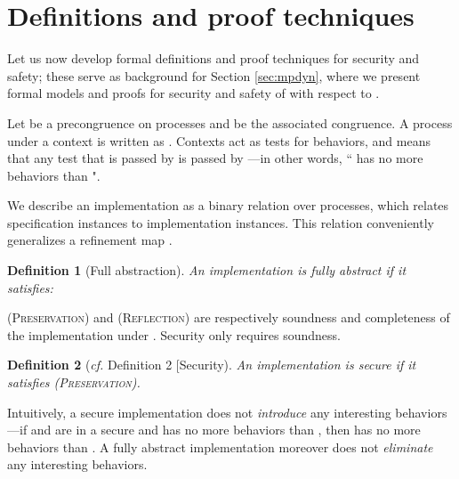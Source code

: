 \documentclass[10pt]{article}
\newtheorem{definition}{Definition}
\begin{document}
\section{Definitions and proof techniques}\label{theory}
\noindent
Let us now develop formal definitions and proof techniques for security and safety; these serve as background for Section \ref{sec:mpdyn}, where we present formal models and proofs for security and safety of  with respect to . 

Let  be a precongruence on processes and  be the associated congruence. A process  under a context  is written as . Contexts act as tests for behaviors, and  means that any test that is passed by  is passed by ---in other words, `` has no more behaviors than ". 

We describe an implementation as a binary relation  over processes, which relates specification instances to implementation instances. This relation conveniently generalizes a refinement map \cite{refmap}. 

\begin{definition}[Full abstraction] An implementation  is fully abstract if it satisfies:

\end{definition}
\noindent
(\textsc{Preservation}) and (\textsc{Reflection}) are respectively soundness and completeness of the implementation under . Security only requires soundness.
\begin{definition}[\emph{cf.} Definition 2 [Security] An implementation is secure if it satisfies \textsc{(Preservation)}.
\end{definition}
\noindent
Intuitively, a secure implementation does not \emph{introduce} any interesting behaviors---if  and  are in a secure  and  has no more behaviors than , then  has no more behaviors than . A fully abstract implementation moreover does not \emph{eliminate} any interesting behaviors.
\end{document}
